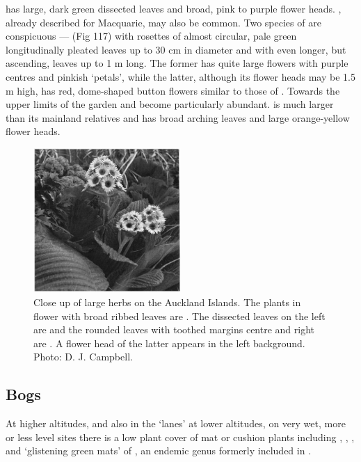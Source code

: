  has large, dark green dissected leaves and broad, pink to purple flower heads. , already described for Macquarie, may also be common.
Two species of  are conspicuous ---  (Fig 117) with rosettes of almost circular, pale green longitudinally pleated leaves up to 30 cm in diameter and  with even longer, but ascending, leaves up to 1 m long.
The former has quite large flowers with purple centres and pinkish `petals', while the latter, although its flower heads may be 1.5 m high, has red, dome-shaped button flowers similar to those of .
Towards the upper limits of the garden  and  become particularly abundant.  is much larger than its mainland relatives and has broad arching leaves and large orange-yellow flower heads.

\begin{figure}
	\includegraphics[width=0.5\textwidth]{graphics/figure117herbs.jpg}
	\centering
	\caption[Close up of large herbs on the Auckland Islands]{Close up of large herbs on the Auckland Islands.
	The plants in flower with broad ribbed leaves are .
	The dissected leaves on the left are  and the rounded leaves with toothed margins centre and right are .
	A flower head of the latter appears in the left background.
	Photo: D. J. Campbell.}%
	\label{fig:117herbs}
\end{figure}

\subsection{Bogs}

At higher altitudes, and also in the `lanes' at lower altitudes, on very wet, more or less level sites there is a low plant cover of mat or cushion plants including , , ,  and `glistening green mats' of , an endemic genus formerly included in .

